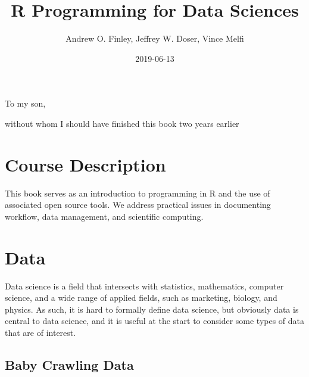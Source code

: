 \documentclass[]{krantz}
\title{R Programming for Data Sciences}
\author{Andrew O. Finley, Jeffrey W. Doser, Vince Melfi}
\date{2019-06-13}
\begin{document}
\maketitle


\thispagestyle{empty}

\begin{center}
To my son,

without whom I should have finished this book two years earlier
\end{center}

\setlength{\abovedisplayskip}{-5pt}
\setlength{\abovedisplayshortskip}{-5pt}

{
\hypersetup{linkcolor=black}
\setcounter{tocdepth}{2}
\tableofcontents
}
\listoftables
\listoffigures
\chapter*{Course Description}\label{course-description}


This book serves as an introduction to programming in R and the use of
associated open source tools. We address practical issues in documenting
workflow, data management, and scientific computing.

\mainmatter

\chapter{Data}\label{data}

Data science is a field that intersects with statistics, mathematics,
computer science, and a wide range of applied fields, such as marketing,
biology, and physics. As such, it is hard to formally define data
science, but obviously data is central to data science, and it is useful
at the start to consider some types of data that are of interest.

\section{Baby Crawling Data}\label{baby-crawling-data}
\end{document}
